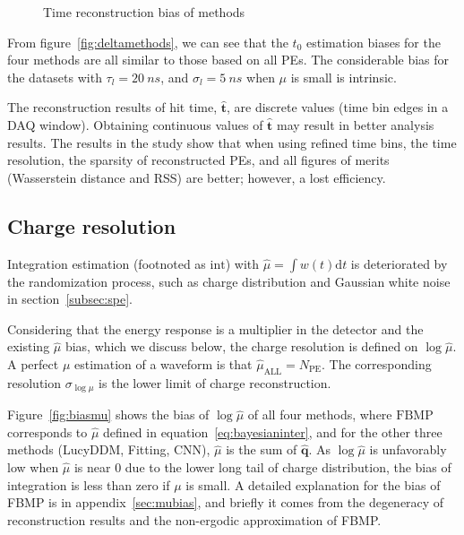 \begin{figure}[H]
    \centering
    \resizebox{\textwidth}{!}{}
    \caption{\label{fig:biasmethods} Time reconstruction bias of methods}
\end{figure}

From figure~\ref{fig:deltamethods}, we can see that the $t_0$ estimation biases for the four methods are all similar to those based on all PEs. The considerable bias for the datasets with $\tau_l=\SI{20}{ns}$, and $\sigma_l=\SI{5}{ns}$ when $\mu$ is small is intrinsic. 


The reconstruction results of hit time, $\bm{\hat{t}}$, are discrete values (time bin edges in a DAQ window). Obtaining continuous values of $\bm{\hat{t}}$ may result in better analysis results. The results in the study show that when using refined time bins, the time resolution, the sparsity of reconstructed PEs, and all figures of merits (Wasserstein distance and RSS) are better; however, a lost efficiency. 

\subsection{Charge resolution}
\label{subsec:chargereconstruction}

Integration estimation (footnoted as $\mathrm{int}$) with $\hat{\mu}=\int w(t)\mathrm{d}t$ is deteriorated by the randomization process, such as charge distribution and Gaussian white noise in section~\ref{subsec:spe}. 

Considering that the energy response is a multiplier in the detector and the existing $\hat{\mu}$ bias, which we discuss below, the charge resolution is defined on $\log{\hat{\mu}}$. A perfect $\mu$ estimation of a waveform is that $\hat{\mu}_\mathrm{ALL}=N_\mathrm{PE}$. The corresponding resolution $\sigma_{\log\mu}$ is the lower limit of charge reconstruction. 

Figure~\ref{fig:biasmu} shows the bias of $\log\hat{\mu}$ of all four methods, where $\mathrm{FBMP}$ corresponds to $\hat{\mu}$ defined in equation~\eqref{eq:bayesianinter}, and for the other three methods (LucyDDM, Fitting, CNN), $\hat{\mu}$ is the sum of $\hat{\bm{q}}$. As $\log\hat{\mu}$ is unfavorably low when $\hat{\mu}$ is near 0 due to the lower long tail of charge distribution, the bias of integration is less than zero if $\mu$ is small. A detailed explanation for the bias of FBMP is in appendix~\ref{sec:mubias}, and briefly it comes from the degeneracy of reconstruction results and the non-ergodic approximation of FBMP. 

